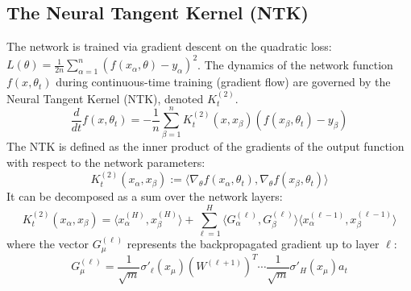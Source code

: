 \documentclass[11pt,a4paper]{article}
\begin{document}
\subsection{The Neural Tangent Kernel (NTK)}

The network is trained via gradient descent on the quadratic loss: $L(\theta) = \frac{1}{2n}\sum_{\alpha=1}^n (f(x_\alpha, \theta) - y_\alpha)^2$. The dynamics of the network function $f(x, \theta_t)$ during continuous-time training (gradient flow) are governed by the Neural Tangent Kernel (NTK), denoted $K^{(2)}_t$.
\begin{equation}
\frac{d}{dt} f(x, \theta_t) = -\frac{1}{n}\sum_{\beta=1}^n K^{(2)}_t(x, x_\beta) (f(x_\beta, \theta_t) - y_\beta)
\end{equation}
The NTK is defined as the inner product of the gradients of the output function with respect to the network parameters:
\begin{equation}
K^{(2)}_t(x_\alpha, x_\beta) := \langle \nabla_\theta f(x_\alpha, \theta_t), \nabla_\theta f(x_\beta, \theta_t) \rangle
\end{equation}
It can be decomposed as a sum over the network layers:
\begin{equation}
K^{(2)}_t(x_\alpha, x_\beta) = \langle x^{(H)}_\alpha, x^{(H)}_\beta \rangle + \sum_{\ell=1}^{H} \langle G^{(\ell)}_\alpha, G^{(\ell)}_\beta \rangle \langle x^{(\ell-1)}_\alpha, x^{(\ell-1)}_\beta \rangle
\end{equation}
where the vector $G^{(\ell)}_\mu$ represents the backpropagated gradient up to layer $\ell$:
\begin{equation}
G^{(\ell)}_\mu = \frac{1}{\sqrt{m}}\sigma'_\ell(x_\mu) (W^{(\ell+1)})^T \cdots \frac{1}{\sqrt{m}}\sigma'_H(x_\mu) a_t
\end{equation}
\end{document}
